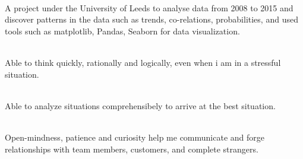 \documentclass[a4paper]{MagicalCV}
\begin{document}
\begin{minipage}[t]{0.66\textwidth}
 \\
 A project under the University of Leeds to analyse data from 2008 to 2015 and discover patterns in the data such as trends, co-relations, probabilities, and used tools such as matplotlib, Pandas, Seaborn for data visualization.
\sectionsep


 \\
Able to think quickly, rationally and logically, even when i am in a stressful situation.
\sectionsep

 \\
 Able to analyze situations comprehensibely to arrive at the best situation.
\sectionsep

 \\
 Open-mindness, patience and curiosity help me communicate and forge relationships with team members, customers, and complete strangers.
\sectionsep



\end{minipage} 
\end{document}
